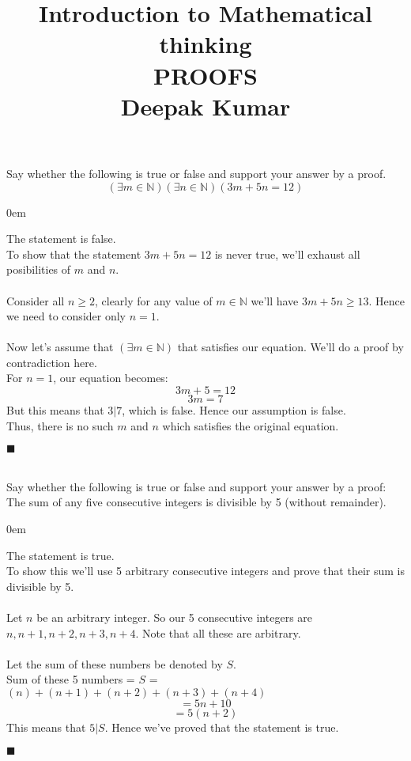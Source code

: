 \documentclass[12pt]{article}
\title{
Introduction to Mathematical thinking\\
\vspace{3 mm}
{\large PROOFS \\}
\vspace{3 mm}
{\Large  Deepak Kumar\\}
}
\newcommand{\N}{\mathbb{N}}
\renewcommand{\qed}{\hfill$\blacksquare$}
\renewenvironment{proof}{\begin{addmargin}[1em]{0em}\begin{newproof}}{\end{newproof}\end{addmargin}\qed}
\newenvironment{problem}[2][Problem]{\begin{trivlist}
\item[\hskip \labelsep {\bfseries #1}\hskip \labelsep {\bfseries #2.}]}{\end{trivlist}}
\begin{document}
 


\rhead{\today}
 
\maketitle
 
\begin{problem}{1} %
Say whether the following is true or false and support your answer by a proof.
$$(\exists m \in \N )(\exists n \in \N)(3m+5n = 12)$$
\end{problem}

\begin{proof}
The statement is false.\\
To show that the statement $ 3m + 5n = 12 $ is never true, we'll exhaust all posibilities of $m$ and $n$.\\ \\
Consider all $n \geq 2$, clearly for any value of $m \in \N$ we'll have $3m + 5n \geq 13$. Hence we need to consider only $n = 1$. \\ \\
Now let's assume that $(\exists m \in \N)$ that satisfies our equation. We'll do a proof by contradiction here.\\
For  $n = 1$, our equation becomes: $$3m + 5 = 12$$
$$3m = 7$$
But this means that $3|7$, which is false. Hence our assumption is false.\\
Thus, there is no such $m$ and $n$ which satisfies the original equation.
\end{proof}
 \\
 \\
 
 \begin{problem}{2} Say whether the following is true or false and support your answer by a proof: The sum of any five consecutive integers is divisible by 5 (without remainder).
\end{problem}

\begin{proof}
The statement is true.\\
To show this we'll use 5 arbitrary consecutive integers and prove that their sum is divisible by 5. \\ \\
Let $n$ be an arbitrary integer. So our 5 consecutive integers are $n, n+1, n+2, n+3, n+4$. Note that all these are arbitrary. \\ \\
Let the sum of these numbers be denoted by $S$. \\
Sum of these 5 numbers = $S$ = $(n) + (n+1) + (n+2) + (n+3) + (n+4)$
$$ = 5n + 10$$
$$ = 5(n + 2)$$
This means that $5|S$.
Hence we've proved that the statement is true.
\end{proof}
 \\
 \\
 
\end{document}
